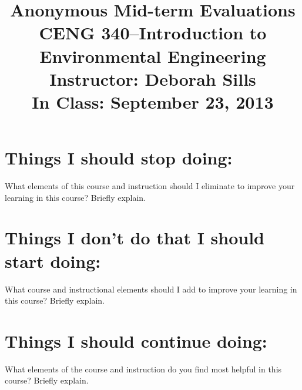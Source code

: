 \documentclass[11pt,letterpaper]{article}
\begin{document}
\setlength{\parindent}{0cm} 



\frenchspacing

\setlength{\textwidth}{6.25in}

\title {\Large{\textbf{Anonymous Mid-term Evaluations}}\\ \large{CENG 340--Introduction to Environmental Engineering\\
Instructor: Deborah Sills\\ \textbf{In Class: September 23, 2013}}}

\author {}
\date {}
\maketitle

\vspace{-2.0cm}\section *{Things I should \textbf{stop} doing:}
What elements of this course and instruction should I eliminate to improve your learning in this course?  Briefly explain.

\vspace{2.5in}

\section *{Things I don't do that I should \textbf{start} doing:}
What course and instructional elements should I add to improve your learning in this course? Briefly explain.
\vspace{2.5in}

\section *{Things I should \textbf{continue} doing:}
What elements of the course and instruction do you find most helpful in this course? Briefly explain.
\end{document}
